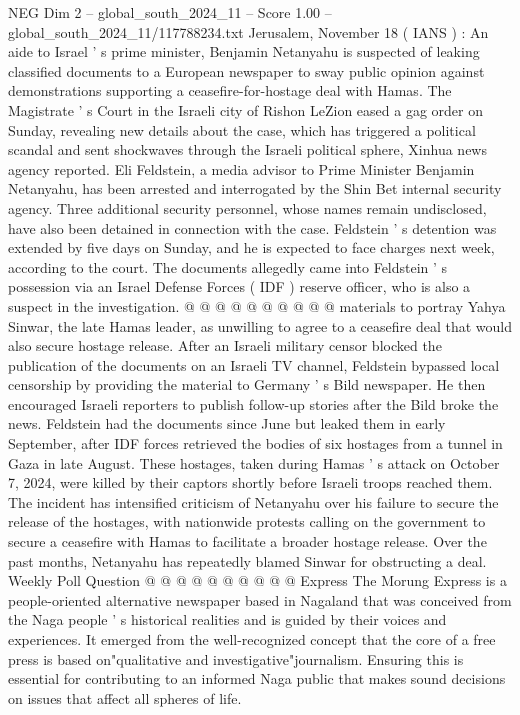 \begin{textsample}{NEG Dim 2 – global\_south\_2024\_11 – Score 1.00 – global\_south\_2024\_11/117788234.txt}  \label{ex:f2_neg_272}
Jerusalem, November 18 ( IANS ) : An aide to Israel ' s prime minister, Benjamin Netanyahu is suspected of leaking classified documents to a European newspaper to sway public opinion against demonstrations supporting a ceasefire-for-hostage deal with Hamas.
The Magistrate ' s Court in the Israeli city of Rishon LeZion eased a gag order on Sunday, revealing new details about the case, which has triggered a political scandal and sent shockwaves through the Israeli political sphere, Xinhua news agency reported.
Eli Feldstein, a media advisor to Prime Minister Benjamin Netanyahu, has been arrested and interrogated by the Shin Bet internal security agency.
Three additional security personnel, whose names remain undisclosed, have also been detained in connection with the case.
Feldstein ' s detention was extended by five days on Sunday, and he is expected to face charges next week, according to the court.
The documents allegedly came into Feldstein ' s possession via an Israel Defense Forces ( IDF ) reserve officer, who is also a suspect in the investigation. @ @ @ @ @ @ @ @ @ @ materials to portray Yahya Sinwar, the late Hamas leader, as unwilling to agree to a ceasefire deal that would also secure hostage release.
After an Israeli military censor blocked the publication of the documents on an Israeli TV channel, Feldstein bypassed local censorship by providing the material to Germany ' s Bild newspaper.
He then encouraged Israeli reporters to publish follow-up stories after the Bild broke the news.
Feldstein had the documents since June but leaked them in early September, after IDF forces retrieved the bodies of six hostages from a tunnel in Gaza in late August.
These hostages, taken during Hamas ' s attack on October 7, 2024, were killed by their captors shortly before Israeli troops reached them.
The incident has intensified criticism of Netanyahu over his failure to secure the release of the hostages, with nationwide protests calling on the government to secure a ceasefire with Hamas to facilitate a broader hostage release.
Over the past months, Netanyahu has repeatedly blamed Sinwar for obstructing a deal.
Weekly Poll Question @ @ @ @ @ @ @ @ @ @ Express The Morung Express is a people-oriented alternative newspaper based in Nagaland that was conceived from the Naga people ' s historical realities and is guided by their voices and experiences.
It emerged from the well-recognized concept that the core of a free press is based on"qualitative and investigative"journalism.
Ensuring this is essential for contributing to an informed Naga public that makes sound decisions on issues that affect all spheres of life.

\end{textsample}
